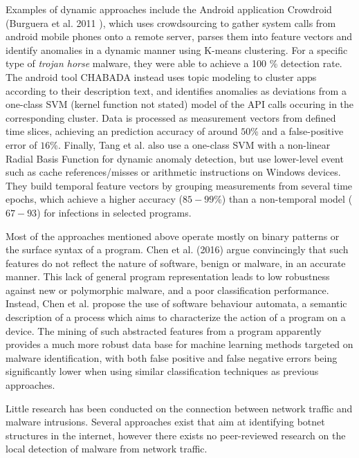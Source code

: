 \documentclass[11pt]{article}
\begin{document}
Examples of dynamic approaches include the Android application Crowdroid (Burguera et al. 2011 \cite{burguera2011crowdroid}), which uses crowdsourcing to gather system calls from android mobile phones onto a remote server, parses them into feature vectors and identify anomalies in a dynamic manner using K-means clustering. For a specific type of \textit{trojan horse} malware, they were able to achieve a 100 \% detection rate. The android tool CHABADA \cite{gorla2014checking} instead uses topic modeling to cluster apps according to their description text, and identifies anomalies as deviations from a one-class SVM (kernel function not stated)  model of the API calls occuring in the corresponding cluster. Data is processed as measurement vectors from defined time slices, achieving an prediction accuracy of around $50$\% and a false-positive error of $16$\%. Finally, Tang et al. \cite{tang2014unsupervised} also use a one-class SVM with a non-linear Radial Basis Function for dynamic anomaly detection, but use lower-level event such as cache references/misses or arithmetic instructions on Windows devices. They build temporal feature vectors by grouping measurements from several time epochs, which achieve a higher accuracy ($85-99$\%) than a non-temporal model ($67-93$) for infections in selected programs. 


Most of the approaches mentioned above operate mostly on binary patterns or the surface syntax of a program. Chen et al. (2016) \cite{chen2016robust, chen2016more} argue convincingly that such features do not reflect the nature of software, benign or malware, in an accurate manner. This lack of general program representation leads to  low robustness against new or polymorphic malware, and a poor classification performance. Instead, Chen et al. propose the use of software behaviour automata, a semantic description of a process which aims to characterize the action of a program on a device. The mining of such abstracted features from a program apparently provides a much more robust data base for machine learning methods targeted on malware identification, with both false positive and false negative errors being significantly lower when using similar classification techniques as previous approaches. 


Little research has been conducted on the connection between network traffic and malware intrusions. Several approaches exist that aim at identifying botnet structures in the internet, however there exists no peer-reviewed research on the local detection of malware from network traffic. 
\end{document}
